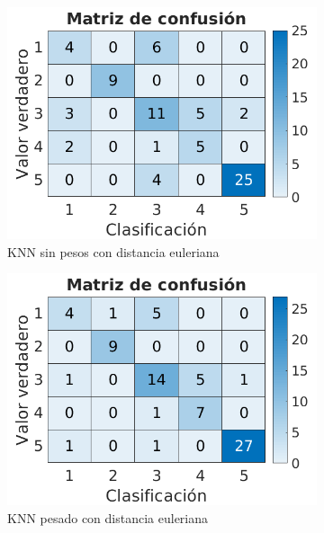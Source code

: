 \documentclass[a4paper]{article}
\begin{document}
\begin{figure}[h]
  \centering
  \begin{subfigure}{.4\textwidth}
    \centering
    \includegraphics[width=\linewidth]{img/cm-eul.png}
    \caption{KNN sin pesos con distancia euleriana}
    \label{sent-cm:sfig1}
  \end{subfigure}%
  \begin{subfigure}{.4\textwidth}
    \centering
    \includegraphics[width=\linewidth]{img/cm-cust.png}
    \caption{KNN pesado con distancia euleriana}
    \label{sent-cm:sfig2}
  \end{subfigure}
  \begin{subfigure}{.4\textwidth}
    \centering

\end{subfigure}
\end{figure}
\end{document}
